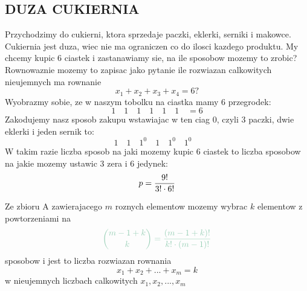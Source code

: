 \documentclass{article}
\begin{document}
\subsection*{DUZA CUKIERNIA}
    Przychodzimy do cukierni, ktora sprzedaje \color{acc}paczki, eklerki, serniki i makowce\color{txt}. Cukiernia jest duza, wiec nie ma ograniczen co do ilosci kazdego produktu. My chcemy kupic 6 ciastek i zastanawiamy sie, \color{emp}na ile sposobow mozemy to zrobic?\color{txt}\smallskip\\
    Rownowaznie mozemy to zapisac jako pytanie \color{emp}ile rozwiazan calkowitych nieujemnych ma rownanie\color{txt}
    $$x_1+x_2+x_3+x_4=6?$$
    \color{acc}Wyobrazmy sobie, ze w naszym tobolku na ciastka mamy 6 przegrodek:
    $$1\quad1\quad1\quad1\quad1\quad1\quad=6$$
    Zakodujemy nasz sposob zakupu wstawiajac w ten ciag 0\color{txt}, czyli 3 paczki, dwie eklerki i jeden sernik to:
    $$1\quad1\quad1^0\quad1\quad1^0\quad1^0\quad$$
    W takim razie liczba sposob na jaki mozemy kupic 6 ciastek to liczba sposobow na jakie mozemy ustawic 3 zera i 6 jedynek:
    $$p={9!\over3!\cdot6!}\bigskip$$
    \begin{center}
        Ze zbioru A zawierajacego \color{def}$m$ roznych elementow \color{txt}mozemy wybrac \color{def}$k$ elementow \color{txt}z powtorzeniami na
        $$\color{emp}{m-1+k\choose k}={(m-1+k)!\over k!\cdot(m-1)!}$$
        sposobow i jest to liczba rozwiazan rownania
        $$x_1+x_2+...+x_m=k$$
        w nieujemnych liczbach calkowitych $x_1, x_2,...,x_m$
    \end{center}
\end{document}
